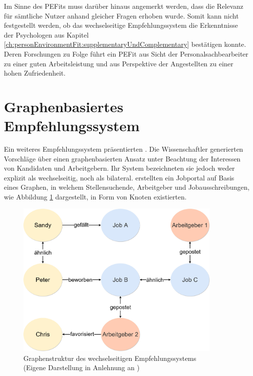 Im Sinne des \acp{PEFit} muss darüber hinaus angemerkt werden, dass die Relevanz für sämtliche Nutzer anhand gleicher Fragen erhoben wurde. Somit kann nicht festgestellt werden, ob das wechselseitige Empfehlungssystem die Erkenntnisse der Psychologen aus Kapitel \ref{ch:personEnvironmentFit:supplementaryUndComplementary} bestätigen konnte. Deren Forschungen zu Folge führt ein \ac{PEFit} aus Sicht der Personalsachbearbeiter zu einer guten Arbeitsleistung und aus Perspektive der Angestellten zu einer hohen Zufriedenheit.

\section{Graphenbasiertes Empfehlungssystem}
\label{ch:verwandteArbeiten:nichtAufDemPEFitBasierendeBilateraleSysteme:lu:2013}
Ein weiteres Empfehlungssystem präsentierten \textcite[S. 1ff.]{lu:2013}. Die Wissenschaftler generierten Vorschläge über einen graphenbasierten Ansatz unter Beachtung der Interessen von Kandidaten und Arbeitgebern. Ihr System bezeichneten sie jedoch weder explizit als wechselseitig, noch als bilateral. \textcite[S. 1ff.]{lu:2013} erstellten ein Jobportal auf Basis eines Graphen, in welchem Stellensuchende, Arbeitgeber und Jobausschreibungen, wie Abbildung \ref{fig:verwandteArbeiten:nichtAufDemPEFitBasierendeBilateraleSysteme:lu:2013:abb1} dargestellt, in Form von Knoten existierten.

\begin{figure}[h]
	\centering
	\includegraphics[width=0.9\textwidth]{gfx/lu-graph.jpg}
	\caption[Graphenstruktur des wechselseitigen Empfehlungssystems]{Graphenstruktur des wechselseitigen Empfehlungssystems\\
		(Eigene Darstellung in Anlehnung an \cite[S. 2]{lu:2013})}
	\label{fig:verwandteArbeiten:nichtAufDemPEFitBasierendeBilateraleSysteme:lu:2013:abb1}
\end{figure}

